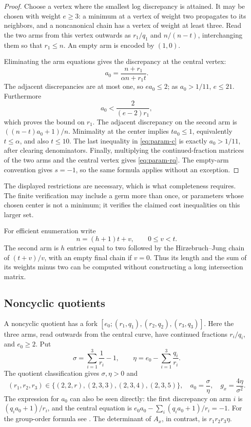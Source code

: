 \documentclass[12pt,a4paper]{article}
\numberwithin{equation}{section}
\theoremstyle{definition}
\begin{document}
\begin{proof}
Choose a vertex where the smallest log discrepancy is attained.
It may be chosen with weight \(e\geq3\): a minimum at a vertex of
weight two propagates to its neighbors, and a noncanonical chain
has a vertex of weight at least three.
Read the two arms from this vertex outwards as
\(r_1/q_1\) and \(n/(n-t)\), interchanging them so that \(r_1\leq n\).
An empty arm is encoded by \((1,0)\).

Eliminating the arm equations gives the discrepancy at the central
vertex:
\begin{equation}\label{eq:central-cyclic}
                a_0=\frac{n+r_1}{\alpha n+r_1t}.
\end{equation}
The adjacent discrepancies are at most one, so \(ea_0\leq2\);
as \(a_0>1/11\), \(e\leq21\).
Furthermore
\[
 a_0<\frac{2}{(e-2)r_1},
\]
which proves the bound on \(r_1\).
The adjacent discrepancy on the second arm is
\(((n-t)a_0+1)/n\). Minimality at the center implies
\(ta_0\leq1\), equivalently \(t\leq\alpha\), and also \(t\leq10\).
The last inequality in \eqref{eq:param-c} is exactly
\(a_0>1/11\), after clearing denominators.
Finally, multiplying the continued-fraction matrices of the two
arms and the central vertex gives \eqref{eq:param-rq}.
The empty-arm convention gives \(s=-1\), so the same formula applies
without an exception.
\end{proof}

The displayed restrictions are necessary, which is what completeness
requires. The finite verification may include a germ more than once,
or parameters whose chosen center is not a minimum; it verifies
the claimed cost inequalities on this larger set.

For efficient enumeration write
\[
 n=(h+1)t+v,\qquad 0\leq v<t.
\]
The second arm is \(h\) entries equal to two followed by the
Hirzebruch--Jung chain of \((t+v)/v\), with an empty final chain if
\(v=0\). Thus its length and the sum of its weights minus two can
be computed without constructing a long intersection matrix.

\subsection{Noncyclic quotients}

A noncyclic quotient has a fork
\([e_0;(r_1,q_1),(r_2,q_2),(r_3,q_3)]\).
Here the three arms, read outwards from the central curve, have
continued fractions \(r_i/q_i\), and \(e_0\geq2\). Put
\[
             \sigma=\sum_{i=1}^3\frac1{r_i}-1,\qquad
             \eta=e_0-\sum_{i=1}^3\frac{q_i}{r_i}.
\]
The quotient classification gives \(\sigma,\eta>0\) and
\begin{equation}\label{eq:fork-data}
 (r_1,r_2,r_3)\in\{(2,2,r),(2,3,3),(2,3,4),(2,3,5)\},
 \quad a_0=\frac{\sigma}{\eta},\quad g_x=\frac{4\eta}{\sigma^2}.
\end{equation}
The expression for \(a_0\) can also be seen directly: the first
discrepancy on arm \(i\) is \((q_i a_0+1)/r_i\), and the central
equation is \(e_0a_0-\sum_i(q_i a_0+1)/r_i=-1\).
For the group-order formula see \cite[Lemma 2.10]{LL26stable}.
The determinant of \(A_x\), in contrast, is \(r_1r_2r_3\eta\).
\end{document}
